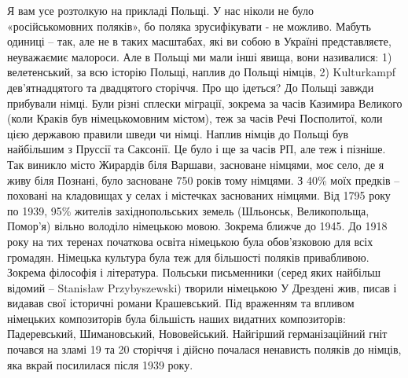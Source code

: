Я вам усе розтолкую на прикладі Польщі. У нас ніколи не було «російськомовних
поляків», бо поляка зрусифікувати  - не можливо. Мабуть одиниці – так, але не в
таких масштабах, які ви собою в Україні представляєте, неуважаємиє малороси.
Але в Польщі ми мали інші явища, вони називалися: 1) велетенський, за всю
історію Польщі, наплив до Польщі німців, 2) Kulturkampf дев’ятнадцятого та
двадцятого сторіччя. Про що ідеться? До Польщі завжди прибували німці. Були
різні сплески міграції, зокрема за часів Казимира Великого (коли Краків був
німецькомовним містом), теж за часів Речі Посполитої, коли цією державою
правили шведи чи німці. Наплив німців до Польщі був найбільшим з Пруссії та
Саксонії. Це було і ще за часів РП, але теж і пізніше. Так виникло місто
Жирардів біля Варшави, засноване німцями, моє село, де я живу біля Познані,
було засноване 750 років тому німцями. З 40\% моїх предків – поховані на
кладовищах у селах і містечках заснованих німцями. Від 1795 року по 1939, 95\%
жителів західнопольських земель (Шльонськ, Великопольща, Помор’я) вільно
володіло німецькою мовою. Зокрема ближче до 1945. До 1918 року на тих теренах
початкова освіта німецькою була обов’язковою для всіх громадян. Німецька
культура була теж для більшості поляків привабливою. Зокрема філософія і
література. Польськи письменники (серед яких найбільш відомий – Stanisław
Przybyszewski) творили німецькою У Дрездені жив, писав і видавав свої історичні
романи Крашевський. Під враженням та впливом німецьких композиторів була
більшість наших видатних композиторів: Падеревський, Шимановський,
Нововейський. Найгірший германізаційний гніт почався на зламі 19 та 20 сторіччя
і дійсно почалася ненависть поляків до німців, яка вкрай посилилася після 1939
року.

